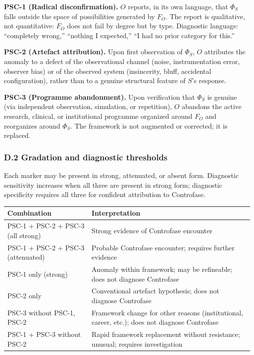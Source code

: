 \documentclass[
  11pt,
  a4paper,
]{article}
\newcounter{none} %
\begin{document}
\textbf{PSC-1 (Radical disconfirmation).} \(O\) reports, in its own
language, that \(\Phi_S\) falls outside the space of possibilities
generated by \(F_O\). The report is qualitative, not quantitative:
\(F_O\) does not fail by degree but by type. Diagnostic language:
``completely wrong,'' ``nothing I expected,'' ``I had no prior category
for this.''

\textbf{PSC-2 (Artefact attribution).} Upon first observation of
\(\Phi_S\), \(O\) attributes the anomaly to a defect of the
observational channel (noise, instrumentation error, observer bias) or
of the observed system (insincerity, bluff, accidental configuration),
rather than to a genuine structural feature of \(S\)'s response.

\textbf{PSC-3 (Programme abandonment).} Upon verification that
\(\Phi_S\) is genuine (via independent observation, simulation, or
repetition), \(O\) abandons the active research, clinical, or
institutional programme organized around \(F_O\) and reorganizes around
\(\Phi_S\). The framework is not augmented or corrected; it is replaced.

\subsubsection{D.2 Gradation and diagnostic
thresholds}\label{d.2-gradation-and-diagnostic-thresholds}

Each marker may be present in strong, attenuated, or absent form.
Diagnostic sensitivity increases when all three are present in strong
form; diagnostic specificity requires all three for confident
attribution to Controfase.

{\def\LTcaptype{none} %
\begin{longtable}[]{@{}
  >{\raggedright\arraybackslash}p{}
  >{\raggedright\arraybackslash}p{}@{}}
\toprule\noalign{}
\begin{minipage}[b]{\linewidth}\raggedright
Combination
\end{minipage} & \begin{minipage}[b]{\linewidth}\raggedright
Interpretation
\end{minipage} \\
\midrule\noalign{}
\endhead
\bottomrule\noalign{}
\endlastfoot
PSC-1 + PSC-2 + PSC-3 (all strong) & Strong evidence of Controfase
encounter \\
PSC-1 + PSC-2 + PSC-3 (attenuated) & Probable Controfase encounter;
requires further evidence \\
PSC-1 only (strong) & Anomaly within framework; may be refineable; does
not diagnose Controfase \\
PSC-2 only & Conventional artefact hypothesis; does not diagnose
Controfase \\
PSC-3 without PSC-1, PSC-2 & Framework change for other reasons
(institutional, career, etc.); does not diagnose Controfase \\
PSC-1 + PSC-3 without PSC-2 & Rapid framework replacement without
resistance; unusual; requires investigation \\
\end{longtable}
}
\end{document}
